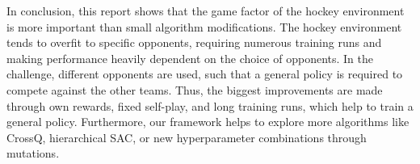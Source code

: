 In conclusion, this report shows that the game factor of the hockey environment is more important than small algorithm modifications. The hockey environment tends to overfit to specific opponents, requiring numerous training runs and making performance heavily dependent on the choice of opponents. In the challenge, different opponents are used, such that a general policy is required to compete against the other teams. Thus, the biggest improvements are made through own rewards, fixed self-play, and long training runs, which help to train a general policy. Furthermore, our framework helps to explore more algorithms like CrossQ, hierarchical \ac{SAC}, or new hyperparameter combinations through mutations.




% 
